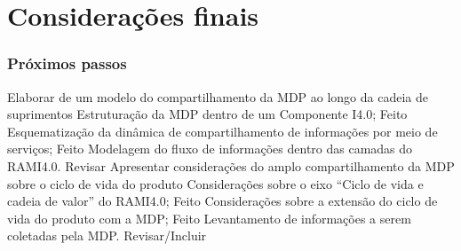 \documentclass[10pt]{beamer}
\begin{document}
\section{Considerações finais}

\begin{frame}
	\frametitle{Próximos passos}
	

	\begin{outline}[enumerate]
		\1 Elaborar de um modelo do compartilhamento da MDP ao longo da cadeia de suprimentos
			\2 Estruturação da MDP dentro de um Componente I4.0; \textcolor{tealgreen}{Feito}
			\2 Esquematização da dinâmica de compartilhamento de informações por meio de serviços; \textcolor{tealgreen}{Feito}
			\2 Modelagem do fluxo de informações dentro das camadas do RAMI4.0. \textcolor{terracotta}{Revisar}
		\1 Apresentar considerações do amplo compartilhamento da MDP sobre o ciclo de vida do produto
			\2 Considerações sobre o eixo ``Ciclo de vida e cadeia de valor'' do RAMI4.0; \textcolor{tealgreen}{Feito}
			\2 Considerações sobre a extensão do ciclo de vida do produto com a MDP; \textcolor{tealgreen}{Feito}
			\2 Levantamento de informações a serem coletadas pela MDP. \textcolor{terracotta}{Revisar/Incluir}
	\end{outline}
	
\end{frame}
\end{document}
